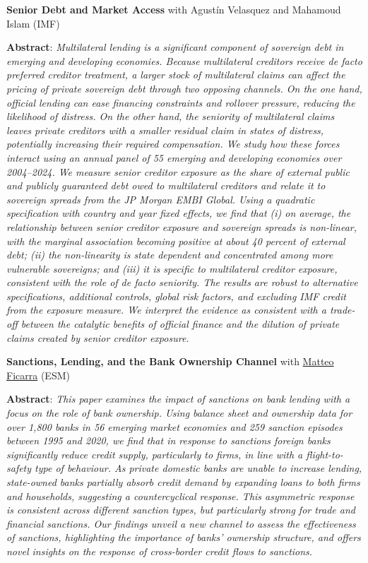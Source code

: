\documentclass[letterpaper,11pt]{article}
\newcommand{\paper}[3]{%
    \textbf{#1}#2\par\vspace{4pt}%
    {\small\textbf{Abstract}: \textit{#3}}\par\vspace{10pt}}
\begin{document}
\paper{Senior Debt and Market Access}{ with Agust\'in Velasquez and Mahamoud Islam (IMF)}{%
Multilateral lending is a significant component of sovereign debt in emerging and
developing economies. Because multilateral creditors receive de facto preferred creditor
treatment, a larger stock of multilateral claims can affect the pricing of private
sovereign debt through two opposing channels. On the one hand, official lending can ease
financing constraints and rollover pressure, reducing the likelihood of distress. On the
other hand, the seniority of multilateral claims leaves private creditors with a smaller
residual claim in states of distress, potentially increasing their required compensation.
We study how these forces interact using an annual panel of 55 emerging and developing
economies over 2004--2024. We measure senior creditor exposure as the share of external
public and publicly guaranteed debt owed to multilateral creditors and relate it to
sovereign spreads from the JP Morgan EMBI Global. Using a quadratic specification with
country and year fixed effects, we find that (i) on average, the relationship between
senior creditor exposure and sovereign spreads is non-linear, with the marginal
association becoming positive at about 40 percent of external debt; (ii) the
non-linearity is state dependent and concentrated among more vulnerable sovereigns; and
(iii) it is specific to multilateral creditor exposure, consistent with the role of de
facto seniority. The results are robust to alternative specifications, additional
controls, global risk factors, and excluding IMF credit from the exposure measure. We
interpret the evidence as consistent with a trade-off between the catalytic benefits of
official finance and the dilution of private claims created by senior creditor exposure.}

\paper{Sanctions, Lending, and the Bank Ownership Channel}{ with \href{https://sites.google.com/view/matteoficarra/home-page}{Matteo Ficarra} (ESM)}{%
This paper examines the impact of sanctions on bank lending with a focus on the role of
bank ownership. Using balance sheet and ownership data for over 1,800 banks in 56
emerging market economies and 259 sanction episodes between 1995 and 2020, we find that
in response to sanctions foreign banks significantly reduce credit supply, particularly
to firms, in line with a flight-to-safety type of behaviour. As private domestic banks
are unable to increase lending, state-owned banks partially absorb credit demand by
expanding loans to both firms and households, suggesting a countercyclical response.
This asymmetric response is consistent across different sanction types, but particularly
strong for trade and financial sanctions. Our findings unveil a new channel to assess
the effectiveness of sanctions, highlighting the importance of banks' ownership
structure, and offers novel insights on the response of cross-border credit flows to
sanctions.}
\end{document}
